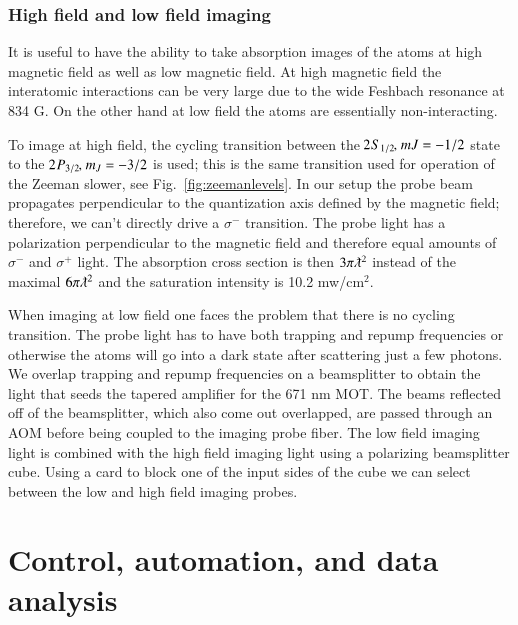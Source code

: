 \documentclass[oneside,12pt]{memoir}
\newcommand{\twos}[1]{\ensuremath{\hspace{-1pt}2\hspace{0.5pt}\hspace{0pt}S_{#1}\hspace{-1pt}}}
\newcommand{\twop}[1]{\ensuremath{\hspace{-1pt}2\hspace{0.5pt}\hspace{0pt}P_{#1}\hspace{-1pt}}}
\newcommand{\cm}{\ensuremath{,\hspace{1pt}}}
\begin{document}
\subsubsection{High field and low field imaging} 

It is useful to have the ability to take absorption images of the atoms  at
high magnetic field as well as low magnetic field.  At high magnetic field the
interatomic interactions can be very large due to  the wide Feshbach resonance
at 834 G.   On the other hand at low field the atoms are essentially
non-interacting.

To image at high field, the cycling transition between the $\twos{1/2}\cm
m{J}=-1/2$ state to the $\twop{3/2}\cm m_{J}=-3/2$ is used; this is the same
transition used for operation of the Zeeman slower, see
Fig.~\ref{fig:zeemanlevels}.  In our setup the probe beam propagates
perpendicular to the quantization axis defined by the magnetic field;
therefore, we can't directly drive a $\sigma^{-}$ transition.   The probe light
has a polarization perpendicular to the magnetic field and therefore equal
amounts of $\sigma^{-}$ and $\sigma^{+}$ light.  The absorption cross section
is then $3\pi\lambdabar^{2}$ instead of the maximal $6\pi\lambdabar^{2}$ and
the saturation intensity is 10.2 mw/cm$^{2}$.   


When imaging at low field one faces the problem that there is no cycling
transition.  The probe light has to have both trapping and repump frequencies
or otherwise the atoms will go into a dark state after scattering just a few
photons.   We overlap trapping and repump frequencies on a beamsplitter to
obtain the light that seeds the tapered amplifier for the 671 nm MOT.   The
beams reflected off of the beamsplitter, which also come out overlapped, are
passed through an AOM before being coupled to the imaging probe fiber.   The
low field imaging light is combined with the high field imaging light using a
polarizing beamsplitter cube.  Using a card to block one of the input sides of
the cube we can select between the low and high field imaging probes. 


\section{Control, automation, and data analysis}
\end{document}
